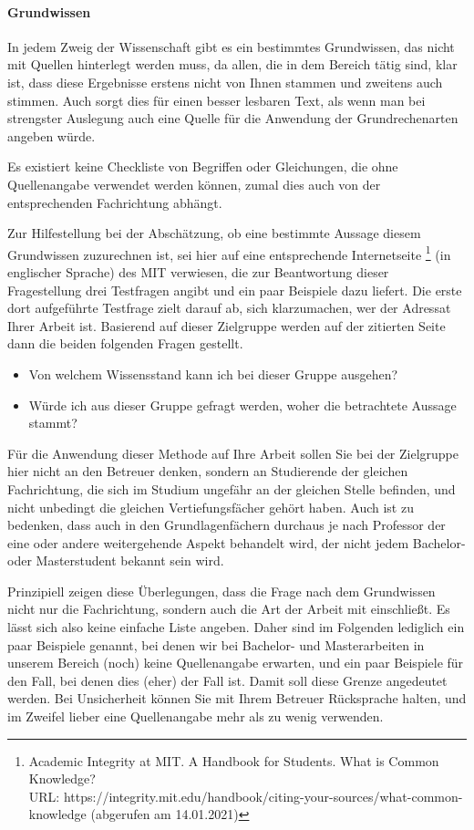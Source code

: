 \paragraph{Grundwissen}

In jedem Zweig der Wissenschaft gibt es ein bestimmtes Grundwissen, das nicht mit Quellen hinterlegt werden muss, da allen, die in dem Bereich tätig sind, klar ist, dass diese Ergebnisse erstens nicht von Ihnen stammen und zweitens auch stimmen.
Auch sorgt dies für einen besser lesbaren Text, als wenn man bei strengster Auslegung auch eine Quelle für die Anwendung der Grundrechenarten angeben würde.

Es existiert keine Checkliste von Begriffen oder Gleichungen, die ohne Quellenangabe verwendet werden können, zumal dies auch von der entsprechenden Fachrichtung abhängt.

Zur Hilfestellung bei der Abschätzung, ob eine bestimmte Aussage diesem Grundwissen zuzurechnen ist, sei hier auf eine entsprechende Internetseite%
\footnote{Academic Integrity at MIT. A Handbook for Students. What is Common Knowledge?\\
URL: https://integrity.mit.edu/handbook/citing-your-sources/what-common-knowledge (abgerufen am 14.01.2021)}
(in englischer Sprache) des MIT verwiesen, die zur Beantwortung dieser Fragestellung drei Testfragen angibt und ein paar Beispiele dazu liefert. Die erste dort aufgeführte Testfrage zielt darauf ab, sich klarzumachen, wer der Adressat Ihrer Arbeit ist. Basierend auf dieser Zielgruppe werden auf der zitierten Seite dann die beiden folgenden Fragen gestellt.
\begin{itemize}
  \item Von welchem Wissensstand kann ich bei dieser Gruppe ausgehen?
  \item Würde ich aus dieser Gruppe gefragt werden, woher die betrachtete Aussage stammt?
\end{itemize}
Für die Anwendung dieser Methode auf Ihre Arbeit sollen Sie bei der Zielgruppe hier nicht an den Betreuer denken, sondern an Studierende der gleichen Fachrichtung, die sich im Studium ungefähr an der gleichen Stelle befinden, und nicht unbedingt die gleichen Vertiefungsfächer gehört haben. Auch ist zu bedenken, dass auch in den Grundlagenfächern durchaus je nach Professor der eine oder andere weitergehende Aspekt behandelt wird, der nicht jedem Bachelor- oder Masterstudent bekannt sein wird.

Prinzipiell zeigen diese Überlegungen, dass die Frage nach dem Grundwissen nicht nur die Fachrichtung, sondern auch die Art der Arbeit mit einschließt. Es lässt sich also keine einfache Liste angeben. Daher sind im Folgenden lediglich ein paar Beispiele genannt, bei denen wir bei Bachelor- und Masterarbeiten in unserem Bereich (noch) keine Quellenangabe erwarten, und ein paar Beispiele für den Fall, bei denen dies (eher) der Fall ist.
Damit soll diese Grenze angedeutet werden.
Bei Unsicherheit können Sie mit Ihrem Betreuer Rücksprache halten, und im Zweifel lieber eine Quellenangabe mehr als zu wenig verwenden.

